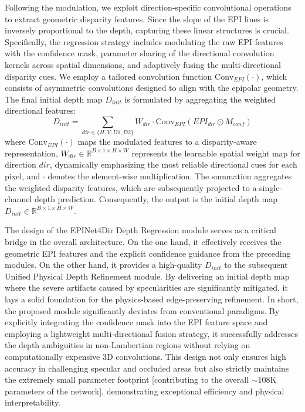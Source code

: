 Following the modulation, we exploit direction-specific convolutional operations to extract geometric disparity features. Since the slope of the EPI lines is inversely proportional to the depth, capturing these linear structures is crucial. Specifically, the regression strategy includes modulating the raw EPI features with the confidence mask, parameter sharing of the directional convolution kernels across spatial dimensions, and adaptively fusing the multi-directional disparity cues. We employ a tailored convolution function $\text{Conv}_{EPI}(\cdot)$, which consists of asymmetric convolutions designed to align with the epipolar geometry. The final initial depth map $D_{init}$ is formulated by aggregating the weighted directional features:
\begin{equation}
\label{eq:eq42}
D_{init} = \sum_{dir \in \{H, V, D1, D2\}} W_{dir} \cdot \text{Conv}_{EPI}(EPI_{dir} \odot M_{conf})
\end{equation}
where $\text{Conv}_{EPI}(\cdot)$ maps the modulated features to a disparity-aware representation, $W_{dir} \in \mathbb{R}^{B \times 1 \times H \times W}$ represents the learnable spatial weight map for direction $dir$, dynamically emphasizing the most reliable directional cues for each pixel, and $\cdot$ denotes the element-wise multiplication. The summation aggregates the weighted disparity features, which are subsequently projected to a single-channel depth prediction. Consequently, the output is the initial depth map $D_{init} \in \mathbb{R}^{B \times 1 \times H \times W}$.

The design of the EPINet4Dir Depth Regression module serves as a critical bridge in the overall architecture. On the one hand, it effectively receives the geometric EPI features and the explicit confidence guidance from the preceding modules. On the other hand, it provides a high-quality $D_{init}$ to the subsequent Unified Physical Depth Refinement module. By delivering an initial depth map where the severe artifacts caused by specularities are significantly mitigated, it lays a solid foundation for the physics-based edge-preserving refinement. In short, the proposed module significantly deviates from conventional paradigms. By explicitly integrating the confidence mask into the EPI feature space and employing a lightweight multi-directional fusion strategy, it successfully addresses the depth ambiguities in non-Lambertian regions without relying on computationally expensive 3D convolutions. This design not only ensures high accuracy in challenging specular and occluded areas but also strictly maintains the extremely small parameter footprint  [contributing to the overall $\sim$108K parameters of the network], demonstrating exceptional efficiency and physical interpretability.

